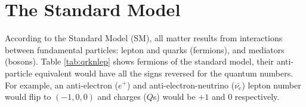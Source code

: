 \section{The Standard Model}
According to the Standard Model (SM), all matter results from interactions between fundamental particles: lepton and quarks (fermions), and mediators (bosons).
Table \ref{tab:qrknlep} shows fermions of the standard model, their anti-particle equivalent would have all the signs reversed for the quantum numbers. For example, an anti-electron (\(e^+\)) and anti-electron-neutrino (\(\bar{\nu_e}\)) lepton number would flip to \((-1, 0, 0)\) and charges (\(Q\)s) would be \(+1\) and 0 respectively.

